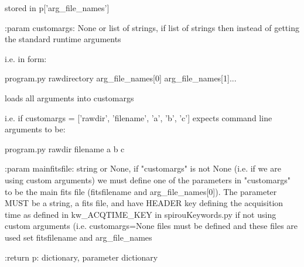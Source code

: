 \begin{minipage}{\textwidth}
\begin{pythondocstring}
              stored in p['arg_file_names']

:param customargs: None or list of strings, if list of strings then instead
                   of getting the standard runtime arguments

       i.e. in form:

            program.py rawdirectory arg_file_names[0] arg_file_names[1]...

       loads all arguments into customargs

       i.e. if customargs = ['rawdir', 'filename', 'a', 'b', 'c']
       expects command line arguments to be:

            program.py rawdir filename a b c

:param mainfitsfile: string or None, if "customargs" is not None (i.e. if we
                     are using custom arguments) we must define one
                     of the parameters in "customargs" to be the main fits
                     file (fitsfilename and arg_file_names[0]).
                     The parameter MUST be a string, a fits file,
                     and have HEADER key defining the acquisition time
                     as defined in kw_ACQTIME_KEY in spirouKeywords.py
                     if not using custom arguments (i.e. customargs=None
                     files must be defined and these files are used
                     set fitsfilename and arg_file_names

:return p: dictionary, parameter dictionary
\end{pythondocstring}
\end{minipage}



